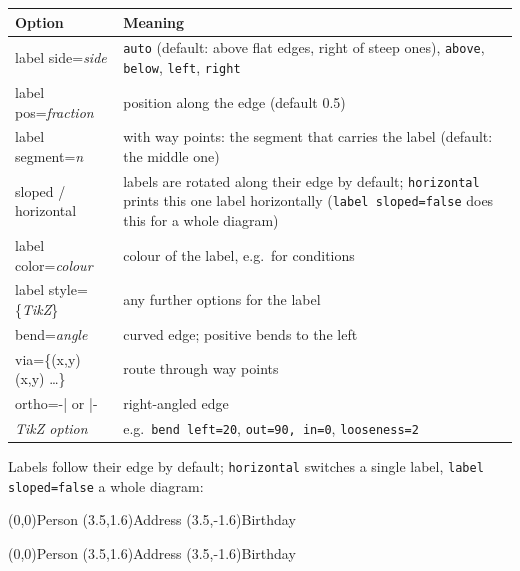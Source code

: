 \documentclass[10pt,a4paper]{article}
\newcommand\meta[1]{\textlangle\textit{#1}\textrangle}
\begin{document}
\begin{longtable}{@{}>{\ttfamily}p{4cm}p{11.8cm}@{}}
\toprule
\normalfont\textbf{Option} & \textbf{Meaning}\\\midrule
label side=\meta{side} & \texttt{auto} (default: above flat edges, right
  of steep ones), \texttt{above}, \texttt{below}, \texttt{left},
  \texttt{right}\\
label pos=\meta{fraction} & position along the edge (default 0.5)\\
label segment=\meta{n} & with way points: the segment that carries the
  label (default: the middle one)\\
sloped / horizontal & labels are rotated along their edge by default;
  \texttt{horizontal} prints this one label horizontally
  (\texttt{label sloped=false} does this for a whole diagram)\\
label color=\meta{colour} & colour of the label, e.g.\ for conditions\\
label style=\{\meta{TikZ}\} & any further options for the label\\
bend=\meta{angle} & curved edge; positive bends to the left\\
via=\{(x,y) (x,y) \dots\} & route through way points\\
ortho=-| \textrm{or} |- & right-angled edge\\
\meta{TikZ option} & e.g.\ \texttt{bend left=20}, \texttt{out=90, in=0},
  \texttt{looseness=2}\\
\bottomrule
\end{longtable}

Labels follow their edge by default; \texttt{horizontal} switches a
single label, \texttt{label sloped=false} a whole diagram:

\begin{example}
\begin{gsmdiagram}
  (0,0){Person}
  (3.5,1.6){Address}
  (3.5,-1.6){Birthday}
\end{gsmdiagram}
\end{example}

\begin{example}
\begin{gsmdiagram}[label sloped=false]
  (0,0){Person}
  (3.5,1.6){Address}
  (3.5,-1.6){Birthday}
\end{gsmdiagram}
\end{example}
\end{document}
